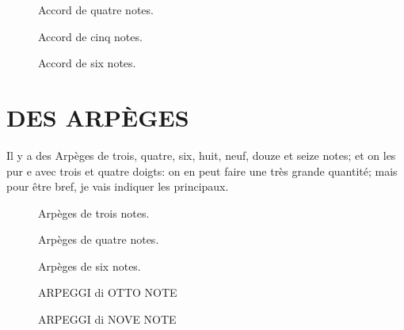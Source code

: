 \documentclass[a4paper]{book}
\begin{document}
{
  \setlength{\intextsep}{10pt}
  \setlength{\abovecaptionskip}{0pt}
  \begin{figure}[h]
    \centering
    \hfill
    \begin{minipage}{2.4in}
      \caption{Accord de quatre notes.}
    \end{minipage}
    \hfill
    \begin{minipage}{3in}
      \caption{Accord de cinq notes.}
    \end{minipage}
  \end{figure}
  \begin{figure}[H]
    \centering
    \begin{minipage}{3.6in}
      \caption{Accord de six notes.}
    \end{minipage}
  \end{figure}
}

\chapter[Les batteries ou arpèges, et un exercice]{DES ARPÈGES}

Il y a des Arpèges de trois, quatre, six, huit, neuf, douze et seize notes; et on les pur e avec trois et quatre doigts: on en peut faire une très grande quantité; mais pour être bref, je vais indiquer les principaux.

\begin{figure}[H]
  \centering
  \hspace*{12pt}
  \begin{minipage}{2.4in}
    \caption{Arpèges de trois notes.}
  \end{minipage}
  \hfill
  \begin{minipage}{3in}
    \caption{Arpèges de quatre notes.}
  \end{minipage}
  \hspace*{10pt}
\end{figure}

\begin{figure}[H]
  \centering
  \begin{minipage}{4.2in}
    \caption{Arpèges de six notes.}
  \end{minipage}
\end{figure}

\begin{figure}[H]
  \centering
  \begin{minipage}{3.2in}
    \caption{ARPEGGI di OTTO NOTE}
  \end{minipage}
  \hfill
  \begin{minipage}{2.7in}
    \caption{ARPEGGI di NOVE NOTE}
  \end{minipage}
\end{figure}
\end{document}
